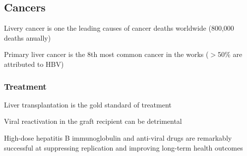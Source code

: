 \documentclass{notes}
\begin{document}
\subsection{Cancers}

Livery cancer is one the leading causes of cancer deaths worldwide (800,000 deaths anually)

\tab Primary liver cancer is the 8th most common cancer in the works (\(>\)50\% are attributed to HBV)

\subsubsection{Treatment}

Liver transplantation is the gold standard of treatment

\tab Viral reactivation in the graft recipient can be detrimental

High-dose hepatitis B immunoglobulin and anti-viral drugs are remarkably successful at suppressing replication and improving long-term health outcomes
\end{document}
